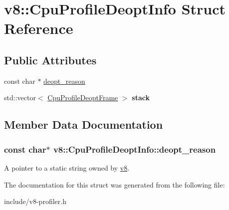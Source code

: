\hypertarget{structv8_1_1_cpu_profile_deopt_info}{}\section{v8\+:\+:Cpu\+Profile\+Deopt\+Info Struct Reference}
\label{structv8_1_1_cpu_profile_deopt_info}
\subsection*{Public Attributes}
\begin{DoxyCompactItemize}
\item 
const char $\ast$ \hyperlink{structv8_1_1_cpu_profile_deopt_info_a908eb3ba33b47ace8973eeb2fda96ca9}{deopt\+\_\+reason}
\item 
std\+::vector$<$ \hyperlink{structv8_1_1_cpu_profile_deopt_frame}{Cpu\+Profile\+Deopt\+Frame} $>$ {\bfseries stack}\hypertarget{structv8_1_1_cpu_profile_deopt_info_a9446493c0e0a00e3ada02ba8df858d42}{}\label{structv8_1_1_cpu_profile_deopt_info_a9446493c0e0a00e3ada02ba8df858d42}

\end{DoxyCompactItemize}


\subsection{Member Data Documentation}
\subsubsection[{\texorpdfstring{deopt\+\_\+reason}{deopt_reason}}]{\setlength{\rightskip}{0pt plus 5cm}const char$\ast$ v8\+::\+Cpu\+Profile\+Deopt\+Info\+::deopt\+\_\+reason}\hypertarget{structv8_1_1_cpu_profile_deopt_info_a908eb3ba33b47ace8973eeb2fda96ca9}{}\label{structv8_1_1_cpu_profile_deopt_info_a908eb3ba33b47ace8973eeb2fda96ca9}
A pointer to a static string owned by \hyperlink{namespacev8}{v8}. 

The documentation for this struct was generated from the following file\+:\begin{DoxyCompactItemize}
\item 
include/v8-\/profiler.\+h\end{DoxyCompactItemize}
